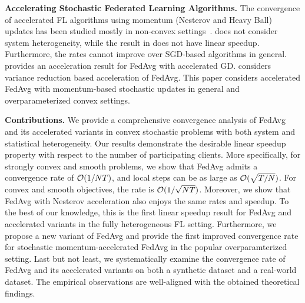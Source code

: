 \textbf{Accelerating Stochastic Federated Learning Algorithms.}
The convergence of accelerated FL algorithms using momentum (Nesterov and Heavy Ball) updates has been studied mostly in non-convex settings~\cite{yu2019linear,huo2020faster}. \cite{yu2019linear} does not consider system heterogeneity, while the result in \cite{huo2020faster} does not have linear speedup. Furthermore, the rates cannot improve over SGD-based algorithms in general. \cite{liu2019accelerating} provides an acceleration result for FedAvg with accelerated GD. \cite{liang2019variance} considers variance reduction based acceleration of FedAvg. This paper considers accelerated FedAvg with momentum-based stochastic updates in general and overparameterized convex settings.

\begin{comment}
	In this work, we provide a novel accelerated FedAvg with improved convergence rates under a popular overparameterized setting. 
\end{comment}








\textbf{Contributions.}
We provide a comprehensive convergence analysis
of FedAvg and its accelerated variants in convex stochastic problems with both system and statistical heterogeneity.
Our results demonstrate the desirable linear speedup property with respect to the number of participating clients.
More specifically, for strongly convex and smooth problems, we show 
that FedAvg admits a convergence rate of 
{\small{${\mathcal{O}}(1/NT)$}}, and local steps can be as large as {\small{${\mathcal{O}}(\sqrt{T/N})$}}. For convex and smooth objectives, the rate is {\small{${\mathcal{O}}(1/\sqrt{NT})$}}. 
Moreover, we show that FedAvg with Nesterov acceleration also enjoys the same rates and speedup. 
To the best of our knowledge, this is the first linear speedup result for FedAvg and accelerated variants in the fully heterogeneous FL setting. Furthermore, 
we propose a new variant of FedAvg and provide the first improved convergence rate for stochastic momentum-accelerated FedAvg in the popular overparamterized setting.
Last but not least, we systematically examine the convergence rate of
FedAvg and its accelerated variants on both a synthetic dataset and  a real-world dataset. The empirical observations are well-aligned with the obtained theoretical findings.


